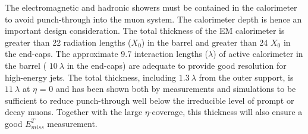 \documentclass[letterpaper,12pt]{article}
\begin{document}
	The electromagnetic and hadronic showers must be contained in the 
	calorimeter to avoid punch-through into the muon system. 
	The calorimeter depth is hence an important design consideration. 
	The total thickness of the EM calorimeter is greater than
	22 radiation lengths ($X_0$) in the barrel and greater than 
	24 $X_0$ in the end-caps. The approximate 9.7 interaction 
	lengths ($\lambda$) of active calorimeter in 
	the barrel ( $10\ \lambda$ in the end-caps) are adequate to 
	provide good resolution for high-energy jets. The total thickness, 
	including $1.3\ \lambda$ from the outer support, is $11\ \lambda$
	at $\eta$ = 0 and has been shown both by measurements and simulations 
	to be sufficient to reduce punch-through well below the irreducible 
	level of prompt or decay muons. Together with the large
	\mbox{$\eta$-coverage}, this thickness will also ensure a good $E_{miss}^T$ 
	measurement.
\end{document}
